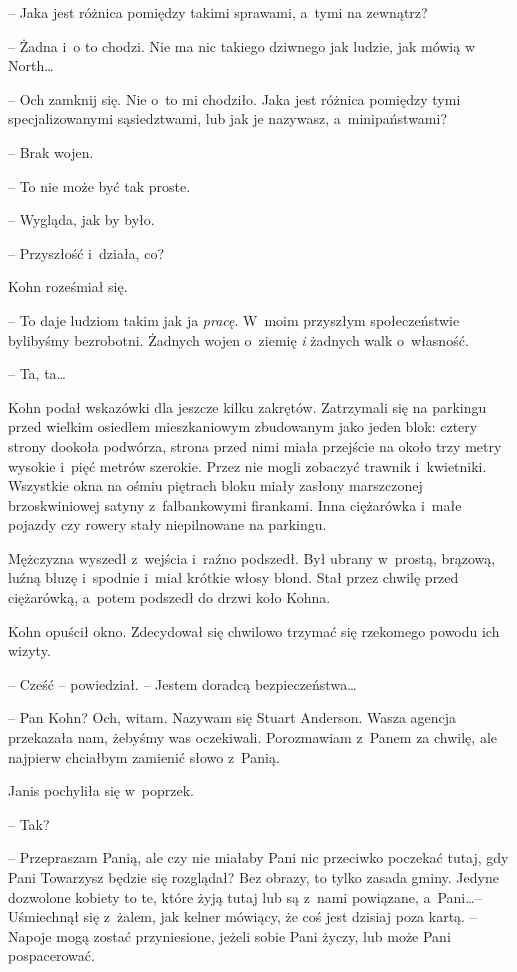 \documentclass[oneside,polish,11pt,sfheadings]{mwbk}
\begin{document}
-- Jaka jest różnica pomiędzy takimi sprawami, a~tymi na zewnątrz?

-- Żadna i~o to chodzi. Nie ma nic takiego dziwnego jak ludzie, jak mówią
w North\ldots

-- Och zamknij się. Nie o~to mi chodziło. Jaka jest różnica pomiędzy tymi
specjalizowanymi sąsiedztwami, lub jak je nazywasz, a~minipaństwami?

-- Brak wojen.

-- To nie może być tak proste.

-- Wygląda, jak by było.

-- Przyszłość i~działa, co?

Kohn roześmiał się. 

-- To daje ludziom takim jak ja \emph{pracę}. W~moim
przyszłym społeczeństwie bylibyśmy bezrobotni. Żadnych wojen o~ziemię
\emph{i} żadnych walk o~własność.

-- Ta, ta\ldots

Kohn podał wskazówki dla jeszcze kilku zakrętów. Zatrzymali się na
parkingu przed wielkim osiedlem mieszkaniowym zbudowanym jako jeden
blok: cztery strony dookoła podwórza, strona przed nimi miała przejście
na około trzy metry wysokie i~pięć metrów szerokie. Przez nie mogli
zobaczyć trawnik i~kwietniki. Wszystkie okna na ośmiu piętrach bloku
miały zasłony marszczonej brzoskwiniowej satyny z~falbankowymi
firankami. Inna ciężarówka i~małe pojazdy czy rowery stały niepilnowane
na parkingu.

Mężczyzna wyszedł z~wejścia i~raźno podszedł. Był ubrany w~prostą,
brązową, luźną bluzę i~spodnie i~miał krótkie włosy blond. Stał przez
chwilę przed ciężarówką, a~potem podszedł do drzwi koło Kohna.

Kohn opuścił okno. Zdecydował się chwilowo trzymać się rzekomego powodu
ich wizyty. 

-- Cześć -- powiedział. -- Jestem doradcą bezpieczeństwa\ldots

-- Pan Kohn? Och, witam. Nazywam się Stuart Anderson. Wasza agencja
przekazała nam, żebyśmy was oczekiwali. Porozmawiam z~Panem za chwilę,
ale najpierw chciałbym zamienić słowo z~Panią.

Janis pochyliła się w~poprzek. 

-- Tak?

-- Przepraszam Panią, ale czy nie miałaby Pani nic przeciwko poczekać
tutaj, gdy Pani Towarzysz będzie się rozglądał? Bez obrazy, to tylko
zasada gminy. Jedyne dozwolone kobiety to te, które żyją tutaj lub są z~nami powiązane, a~Pani\ldots -- Uśmiechnął się z~żalem, jak kelner mówiący,
że coś jest dzisiaj poza kartą. -- Napoje mogą zostać przyniesione,
jeżeli sobie Pani życzy, lub może Pani pospacerować.
\end{document}
